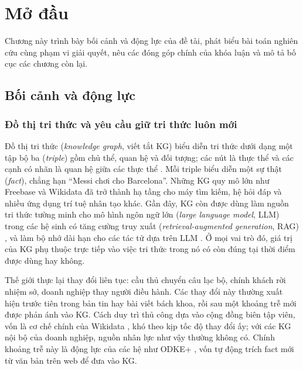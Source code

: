 \chapter{Mở đầu}
\label{chap:intro}

Chương này trình bày bối cảnh và động lực của đề tài, phát biểu bài toán nghiên cứu cùng phạm vi giải quyết,
nêu các đóng góp chính của khóa luận và mô tả bố cục các chương còn lại.

\section{Bối cảnh và động lực}
\label{sec:intro-context}

\subsection{Đồ thị tri thức và yêu cầu giữ tri thức luôn mới}
\label{sec:intro-kg}

Đồ thị tri thức (\textit{knowledge graph}, viết tắt KG) biểu diễn tri thức dưới dạng một tập bộ ba (\textit{triple}) gồm chủ thể, quan hệ và đối tượng;
các nút là thực thể và các cạnh có nhãn là quan hệ giữa các thực thể \cite{hogan2021kg}.
Mỗi triple biểu diễn một sự thật (\textit{fact}), chẳng hạn ``Messi chơi cho Barcelona''.
Những KG quy mô lớn như Freebase \cite{bollacker2008freebase} và Wikidata \cite{vrandecic2014wikidata}
đã trở thành hạ tầng cho máy tìm kiếm, hệ hỏi đáp và nhiều ứng dụng trí tuệ nhân tạo khác.
Gần đây, KG còn được dùng làm nguồn tri thức tường minh cho mô hình ngôn ngữ lớn (\textit{large language model}, LLM)
trong các hệ sinh có tăng cường truy xuất (\textit{retrieval-augmented generation}, RAG) \cite{lewis2020rag,edge2024graphrag},
và làm bộ nhớ dài hạn cho các tác tử dựa trên LLM \cite{rasmussen2025zep,chhikara2025mem0,arigraph2024}.
Ở mọi vai trò đó, giá trị của KG phụ thuộc trực tiếp vào việc tri thức trong nó có còn đúng tại thời điểm được dùng hay không.

Thế giới thực lại thay đổi liên tục: cầu thủ chuyển câu lạc bộ, chính khách rời nhiệm sở, doanh nghiệp thay người điều hành.
Các thay đổi này thường xuất hiện trước tiên trong bản tin hay bài viết bách khoa, rồi sau một khoảng trễ mới được phản ánh vào KG.
Cách duy trì thủ công dựa vào cộng đồng biên tập viên, vốn là cơ chế chính của Wikidata \cite{vrandecic2014wikidata},
khó theo kịp tốc độ thay đổi ấy; với các KG nội bộ của doanh nghiệp, nguồn nhân lực như vậy thường không có.
Chính khoảng trễ này là động lực của các hệ như ODKE+ \cite{odke2025}, vốn tự động trích fact mới từ văn bản trên web để đưa vào KG.

